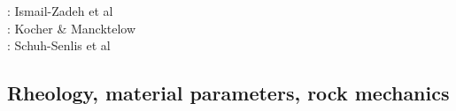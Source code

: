 \begin{scriptsize}
\twothousandone: Ismail-Zadeh et al \cite{istv01}\\
\twothousandfive: Kocher \& Mancktelow \cite{koma05}\\
\twothousandtwenty: Schuh-Senlis et al \cite{sctc20}
\end{scriptsize}


\subsection{Rheology, material parameters, rock mechanics}

